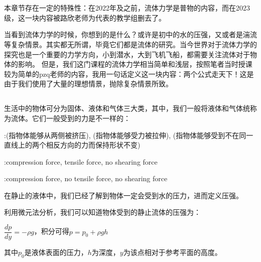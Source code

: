 \begin{comment}
    \documentclass{Physics_H_Notes}
    \usepackage{upgreek}
    
    \end{comment}
        \chapter[流体力学]{}
        本章节存在一定的特殊性：在2022年及之前，流体力学是普物的内容，而在2023级，这一块内容被路欣老师为代表的教学组删去了。

        当看到流体力学的时候，你想到的是什么？或许是初中的水的压强，又或者是湍流等复杂情景。其实都无所谓，毕竟它们都是流体的研究。当今世界对于流体力学的探究也是一个重要的力学方向，小到潜水，大到飞机飞船，都需要关注流体对于物体的影响。
        但是，我们这门课程的流体力学相当简单和浅层，按照笔者当时授课较为简单的pzq老师的内容，我用一句话定义这一块内容：两个公式走天下！这是由于我们使用了大量的理想情景，抛除复杂情景所致。
        \section[流体的定义与性质]{}
        生活中的物体可分为固体、液体和气体三大类，其中，我们一般将液体和气体统称为流体。它们一般受到的力是不一样的：
        \begin{Itemize}
            \item {}:(指物体能够从两侧被挤压), (指物体能够受力被拉伸), 
                (指物体能够受到不在同一直线上的两个相反方向的力而保持形状不变)
            \item {}:compression force, tensile force, no shearing force
            \item {}:compression force, no tensile force, no shearing force
        \end{Itemize}
        
        在静止的液体中，我们已经了解到物体一定会受到水的压力，进而定义压强。
        \begin{law}[静止流体中的压强]
            利用微元法分析，我们可以知道物体受到的静止流体的压强为：
            \begin{center}
                $\dfrac{dp}{dy}=-\rho g$，积分可得$p=p_0+\rho gh$
            \end{center}

            其中$p_0$是液体表面的压力，$h$为深度，$y$为该点相对于参考平面的高度。
        \end{law}
        
